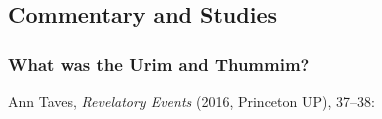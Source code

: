 	
	
	
\subsection{Commentary and Studies} %
	\label{URIMTHUMMIM-COMMENTARY}

	
		
	\subsubsection{What was the Urim and Thummim?}
		\label{URIMTHUMMIM-what}
		
		Ann Taves, \textit{Revelatory Events} (2016, Princeton UP), 37--38:
		
